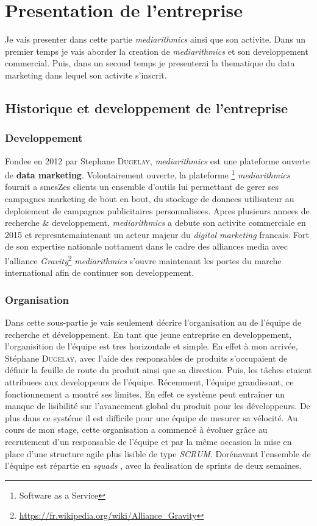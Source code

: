\section{Presentation de l'entreprise}
    Je vais presenter dans cette partie \emph{mediarithmics} ainsi que son activite. Dans un premier temps je vais 
    aborder la creation de \emph{mediarithmics} et son developpement commercial. Puis, dans un second temps je 
    presenterai la thematique du data marketing dans lequel son activite s'inscrit.
    \subsection{Historique et developpement de l'entreprise}
        \subsubsection{Developpement}
            Fondee en 2012 par Stephane \textsc{Dugelay}, \emph{mediarithmics} est une plateforme ouverte de 
            \textbf{data marketing}. Volontairement ouverte, la plateforme \footnote{Software as a Service} 
            \emph{mediarithmics} fournit a smesZes clients un ensemble d'outils lui permettant de gerer ses campagnes 
            marketing de bout en bout, du stockage de donnees utilisateur au deploiement de campagnes publicitaires 
            personnalisees. Apres plusieurs annees de recherche \& developpement, \emph{mediarithmics} a debute son 
            activite commerciale en 2015 et represntemaintenant un acteur majeur du \emph{digital marketing} francais. 
            Fort de son expertise nationale nottament dans le cadre des alliances media avec l'alliance 
            \emph{Gravity}\footnote{\url{https://fr.wikipedia.org/wiki/Alliance\_Gravity}} \emph{mediarithmics} s'ouvre 
            maintenant les portes du marche international afin de continuer son developpement.
        \subsubsection{Organisation}
            Dans cette sous-partie je vais seulement décrire l'organisation au de l'équipe de recherche et développement.
            En tant que jeune entreprise en developpement, l'organisition de l'équipe est tres horizontale et simple. 
            En effet à mon arrivée, Stéphane \textsc{Dugelay}, avec l'aide des responsables de produits s'occupaient de 
            définir la feuille de route du produit ainsi que sa direction. Puis, les tâches etaient attribuees aux 
            developpeurs de l'équipe. Récemment, l'équipe grandissant, ce fonctionnement a montré ses limites. En effet 
            ce système peut entraîner un manque de lisibilité sur l'avancement global du produit pour les développeurs. 
            De plus dans ce systéme il est difficile pour une équipe de mesurer sa vélocité. Au cours de mon stage, 
            cette organisation a commencé à évoluer grâce au recrutement d'un responsable de l'équipe et par la même 
            occasion la mise en place d'une structure agile plus lisible de type \emph{SCRUM}. Dorénavant l'ensemble de l'équipe est 
            répartie en \emph{squads} \cite{spotify}, avec la ŕealisation de sprints de deux semaines.

